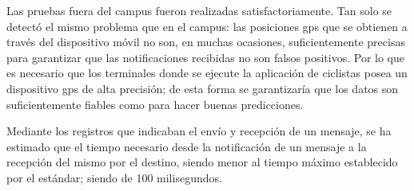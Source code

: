 Las pruebas fuera del campus fueron realizadas satisfactoriamente. Tan solo
se detectó el mismo problema que en el campus: las posiciones \gls{gps} que se
obtienen a través del dispositivo móvil no son, en muchas ocasiones,
suficientemente precisas para garantizar que las notificaciones recibidas
no son falsos positivos. Por lo que es necesario que los terminales donde se
ejecute la aplicación de ciclistas posea un dispositivo \gls{gps} de alta
precisión; de esta forma se garantizaría que los datos son suficientemente
fiables como para hacer buenas predicciones.

Mediante los registros que indicaban el envío y recepción de un mensaje, se ha
estimado que el tiempo necesario desde la notificación de un mensaje a la
recepción del mismo por el destino, siendo menor al tiempo máximo establecido
por el estándar; siendo de 100 milisegundos.
